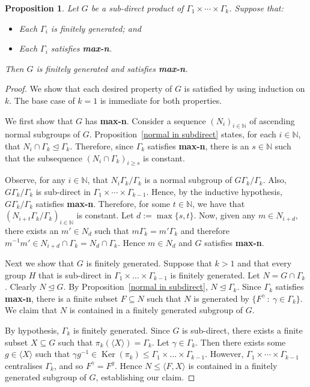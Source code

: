 \documentclass[11pt,a4paper]{amsart}
\newtheorem{proposition}[theorem]{Proposition}
\theoremstyle{definition}
\theoremstyle{remark}
\newcommand{\N}{\mathbb N}
\renewcommand{\ker}{\operatorname{Ker}}
\begin{document}
\begin{proposition}
	\label{finite gen for subdirect}
	Let $G$ be a sub-direct product of $\Gamma_1 \times \cdots \times \Gamma_k$. Suppose that:
	\begin{itemize}
		\item Each $\Gamma_i$ is finitely generated; and
		\item Each $\Gamma_i$ satisfies \textbf{max-n}. 
	\end{itemize}
Then $G$ is finitely generated and satisfies \textbf{max-n}. 


\end{proposition}
\begin{proof}
We show that each desired property of $G$ is satisfied by using induction on $k$. The base case of $k=1$ is immediate for both properties.
	
	We first show that $G$ has \textbf{max-n}. Consider a sequence $(N_i)_{i\in\N}$ of ascending normal subgroups of $G$. Proposition~\ref{normal in subdirect} states, for each $i\in \N$, that $N_i \cap \Gamma_k\unlhd\Gamma_k$. Therefore, since $\Gamma_k$ satisfies \textbf{max-n}, there is an $s\in \N$ such that the subsequence $(N_{i}\cap \Gamma_k)_{i\ge s}$ is constant. 
	
	Observe, for any $i\in \N$, that $N_i \Gamma_k/\Gamma_k$ is a normal subgroup of $G \Gamma_k/\Gamma_k$. Also, $G \Gamma_k/\Gamma_k$ is sub-direct in $\Gamma_1 \times \cdots \times \Gamma_{k-1}$. Hence, by the inductive hypothesis, $G \Gamma_k/\Gamma_k$ satisfies \textbf{max-n}. Therefore, for some $t\in \N$, we have that $(N_{i+t} \Gamma_k/\Gamma_k)_{i\in\N}$ is constant. Let $d:=\max\{s, t\}$. Now, given any $m \in N_{i+d}$, there exists an $m' \in N_d$ such that $m \Gamma_k = m'\Gamma_k$ and therefore $m^{-1} m' \in N_{i+d} \cap  \Gamma_k = N_d \cap \Gamma_k$. Hence $m \in N_d$ and $G$ satisfies \textbf{max-n}.  
	
	Next we show that $G$ is finitely generated. Suppose that $k >1$ and that every group $H$ that is sub-direct in $\Gamma_1 \times \ldots  \times \Gamma_{k-1}$ is finitely generated. Let $N = G \cap \Gamma_k$. Clearly $N\unlhd G$. By Proposition~\ref{normal in subdirect}, $N\unlhd\Gamma_k$. Since $\Gamma_k$ satisfies \textbf{max-n}, there is a finite subset $F \subseteq N$ such that $N$ is generated by $\{ F^{\gamma} \ : \ \gamma \in \Gamma_k \}$. We claim that $N$ is contained in a finitely generated subgroup of $G$. 
	
	By hypothesis, $\Gamma_k$ is finitely generated. Since $G$ is sub-direct, there exists a finite subset $X\subseteq G$ such that $\pi_k(\langle X \rangle ) = \Gamma_k$. Let $\gamma \in \Gamma_k$. Then there exists some $g \in \langle X \rangle$ such that $\gamma g^{-1} \in \ker(\pi_k) \leq \Gamma_1 \times \ldots  \times \Gamma_{k-1}$. However, $\Gamma_1 \times \cdots \times \Gamma_{k-1}$ centralises $\Gamma_k$, and so $F^{\gamma} = F^g$. Hence $N \leq \langle F, X \rangle$ is contained in a finitely generated subgroup of $G$, establishing our claim. 
	

\end{proof}
\end{document}
